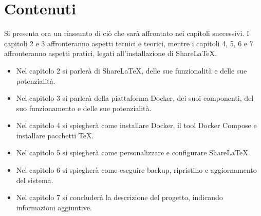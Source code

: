 \section{Contenuti}
Si presenta ora un riassunto di ciò che sarà affrontato nei capitoli successivi. I capitoli 2 e 3 affronteranno aspetti tecnici e teorici, mentre i capitoli 4, 5, 6 e 7 affronteranno aspetti pratici, legati all'installazione di ShareLaTeX.
\begin{itemize}
    \item Nel capitolo 2 si parlerà di ShareLaTeX, delle sue funzionalità e delle sue potenzialità.
    \item Nel capitolo 3 si parlerà della piattaforma Docker, dei suoi componenti, del suo funzionamento e delle sue potenzialità.
    \item Nel capitolo 4 si spiegherà come installare Docker, il tool Docker Compose e installare pacchetti \TeX.
    \item Nel capitolo 5 si spiegherà come personalizzare e configurare ShareLaTeX.
    \item Nel capitolo 6 si spiegherà come eseguire backup, ripristino e aggiornamento del sistema.
    \item Nel capitolo 7 si concluderà la descrizione del progetto, indicando informazioni aggiuntive.
\end{itemize}